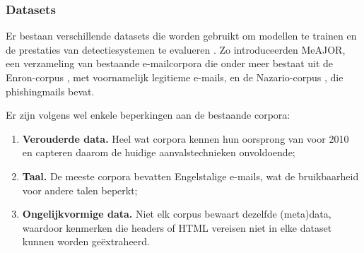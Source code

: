 \subsubsection{Datasets}
\label{subsubsec:datasets}

Er bestaan verschillende datasets die worden gebruikt om modellen te trainen en de prestaties van detectiesystemen te evalueren \autocite{Salloum2022}. Zo introduceerden \textcite{Mendes2025} MeAJOR, een verzameling van bestaande e-mailcorpora die onder meer bestaat uit de Enron-corpus \autocite{klimt2004}, met voornamelijk legitieme e-mails, en de Nazario-corpus , die phishingmails bevat.

Er zijn volgens \textcite{Pajola2025} wel enkele beperkingen aan de bestaande corpora:
\begin{enumerate}
    \item \textbf{Verouderde data.} Heel wat corpora kennen hun oorsprong van voor 2010 en capteren daarom de huidige aanvalstechnieken onvoldoende;
    \item \textbf{Taal.} De meeste corpora bevatten Engelstalige e-mails, wat de bruikbaarheid voor andere talen beperkt;
    \item \textbf{Ongelijkvormige data.} Niet elk corpus bewaart dezelfde (meta)data, waardoor kenmerken die headers of HTML vereisen niet in elke dataset kunnen worden geëxtraheerd.
\end{enumerate}
